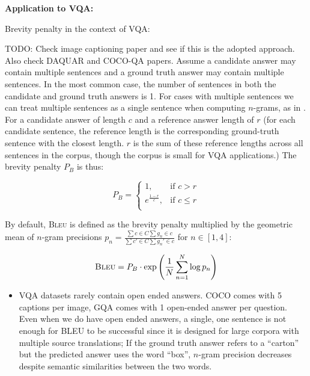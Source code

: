 \textbf{Application to VQA:}

Brevity penalty in the context of VQA:

{\color{red} TODO: Check image captioning paper and see if this is the adopted approach. Also check DAQUAR and COCO-QA papers.} Assume a candidate answer may contain multiple sentences and a ground truth answer may contain multiple sentences. In the most common case, the number of sentences in both the candidate and ground truth answers is 1. For cases with multiple sentences we can treat multiple sentences as a single sentence when computing \(n\)-grams, as in \cite{papineni2002bleu}. For a candidate answer of length \(c\) and a reference answer length of \(r\) (for each candidate sentence, the reference length is the corresponding ground-truth sentence with the closest length. \(r\) is the sum of these reference lengths across all sentences in the corpus, though the corpus is small for VQA applications.) The brevity penalty \(P_B\) is thus:

\begin{equation*}
    P_B = \begin{cases}
    1, &\text{if } c > r\\
    e^{\frac{1-r}{c}}, &\text{if } c \leq r\\
    \end{cases}
\end{equation*}


By default, \textsc{Bleu} is defined as the brevity penalty multiplied by the geometric mean of \(n\)-gram precisions \(p_n = \frac{\sum{c \in C} \sum g_n \in c }{\sum{c' \in C} \sum g_n' \in c}\) for \(n \in [1, 4]\):

\begin{equation*}
    \textsc{Bleu} = P_B \cdot \exp \left(\frac{1}{N} \sum_{n=1}^N \log p_n\right)
\end{equation*}

\begin{itemize}
    \item VQA datasets rarely contain open ended answers. COCO comes with 5 captions per image, GQA comes with 1 open-ended answer per question. Even when we do have open ended answers, a single, one sentence is not enough for BLEU to be successful since it is designed for large corpora with multiple source translations; If the ground truth answer refers to a ``carton'' but the predicted answer uses the word ``box'', \(n\)-gram precision decreases despite semantic similarities between the two words. 
\end{itemize}

